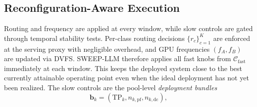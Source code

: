 \subsection{Reconfiguration-Aware Execution}
\label{sec:reconfig}
\iffalse
Routing and frequency are applied at every window, while slow controls are gated through temporal stability tests.
Per-class routing decisions $\{r_c\}_{c=1}^{K}$ are enforced at the serving proxy with negligible overhead, and GPU frequencies $(f_A,f_B)$ are updated via DVFS.
SWEEP-LLM therefore applies all fast knobs from $\mathcal{C}_{\mathrm{fast}}$ immediately at each window.
This keeps the deployed system close to the best currently attainable operating point even when the ideal deployment has not yet been realized.
The slow controls are the pool-level \emph{deployment bundles}
\begin{equation}
\mathbf{b}_k = (\mathrm{TP}_k,n_{k,\mathrm{pf}},n_{k,\mathrm{dc}}),
\label{eq:pool_bundle}
\end{equation}
